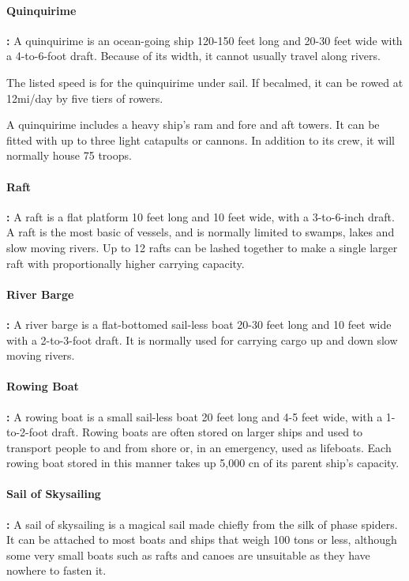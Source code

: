 \begin{multicols*}{2}
\paragraph{Quinquirime}\textbf{:} A quinquirime is an ocean-going ship 120-150 feet long and 20-30 feet wide with a 4-to-6-foot draft. Because of its width, it cannot usually travel along rivers.

The listed speed is for the quinquirime under sail. If becalmed, it can be rowed at 12mi/day by five tiers of rowers.

A quinquirime includes a heavy ship’s ram and fore and aft towers. It can be fitted with up to three light catapults or cannons. In addition to its crew, it will normally house 75 troops.

\paragraph{Raft}\textbf{:} A raft is a flat platform 10 feet long and 10 feet wide, with a 3-to-6-inch draft. A raft is the most basic of vessels, and is normally limited to swamps, lakes and slow moving rivers. Up to 12 rafts can be lashed together to make a single larger raft with proportionally higher carrying capacity.

\paragraph{River Barge}\textbf{:} A river barge is a flat-bottomed sail-less boat 20-30 feet long and 10 feet wide with a 2-to-3-foot draft. It is normally used for carrying cargo up and down slow moving rivers.

\paragraph{Rowing Boat}\textbf{:} A rowing boat is a small sail-less boat 20 feet long and 4-5 feet wide, with a 1-to-2-foot draft. Rowing boats are often stored on larger ships and used to transport people to and from shore or, in an emergency, used as lifeboats. Each rowing boat stored in this manner takes up 5,000 cn of its parent ship’s capacity.

\paragraph{Sail of Skysailing}\label{eq:Sail of Skysailing}\textbf{:} A sail of skysailing is a magical sail made chiefly from the silk of phase spiders. It can be attached to most boats and ships that weigh 100 tons or less, although some very small boats such as rafts and canoes are unsuitable as they have nowhere to fasten it.


\end{multicols*}

